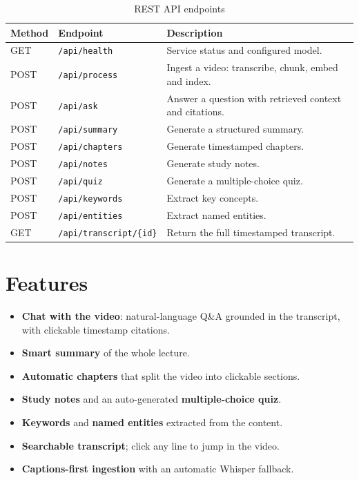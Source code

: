 \documentclass[11pt,a4paper]{article}
\newcommand{\code}[1]{\texttt{#1}}
\begin{document}
\begin{table}[h]
\centering
\renewcommand{\arraystretch}{1.25}
\begin{tabularx}{\textwidth}{@{}l l X@{}}
\toprule
\textbf{Method} & \textbf{Endpoint} & \textbf{Description} \\
\midrule
GET  & \code{/api/health}              & Service status and configured model. \\
POST & \code{/api/process}             & Ingest a video: transcribe, chunk, embed and index. \\
POST & \code{/api/ask}                 & Answer a question with retrieved context and citations. \\
POST & \code{/api/summary}             & Generate a structured summary. \\
POST & \code{/api/chapters}            & Generate timestamped chapters. \\
POST & \code{/api/notes}               & Generate study notes. \\
POST & \code{/api/quiz}                & Generate a multiple-choice quiz. \\
POST & \code{/api/keywords}            & Extract key concepts. \\
POST & \code{/api/entities}            & Extract named entities. \\
GET  & \code{/api/transcript/\{id\}}    & Return the full timestamped transcript. \\
\bottomrule
\end{tabularx}
\caption{REST API endpoints}
\end{table}

\section{Features}
\begin{itemize}[leftmargin=1.4em]
  \item \textbf{Chat with the video}: natural-language Q\&A grounded in the transcript,
        with clickable timestamp citations.
  \item \textbf{Smart summary} of the whole lecture.
  \item \textbf{Automatic chapters} that split the video into clickable sections.
  \item \textbf{Study notes} and an auto-generated \textbf{multiple-choice quiz}.
  \item \textbf{Keywords} and \textbf{named entities} extracted from the content.
  \item \textbf{Searchable transcript}; click any line to jump in the video.
  \item \textbf{Captions-first ingestion} with an automatic Whisper fallback.
\end{itemize}
\end{document}
